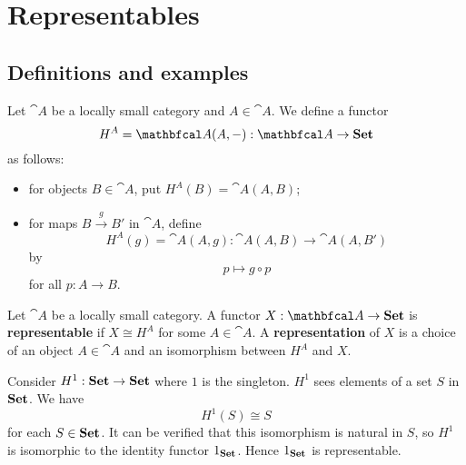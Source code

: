 \section{Representables}
\subsection{Definitions and examples}
\begin{definition}
    Let $\cat{A}$ be a locally small category and $A\in\cat{A}$. We define a functor
    \begin{equation*}
        H^A=\cat{A}(A,-): \cat{A}\to\bcat{Set}
    \end{equation*}
    as follows:
    \begin{itemize}
        \item for objects $B\in\cat{A}$, put $H^A(B)=\cat{A}(A,B)$;
        \item for maps $B\xrightarrow{g}B'$ in $\cat{A}$, define
            \begin{equation*}
                H^A(g)=\cat{A}(A,g): \cat{A}(A,B)\to\cat{A}(A,B')
            \end{equation*}
            by
            \begin{equation*}
                p\mapsto g\circ p
            \end{equation*}
            for all $p:A\to B$.
    \end{itemize}
\end{definition}

\begin{definition}
    Let $\cat{A}$ be a locally small category. A functor $X:\cat{A}\to\bcat{Set}$ is \textbf{representable} if $X\cong H^A$ for some $A\in\cat{A}$. A \textbf{representation} of $X$ is a choice of an object $A\in\cat{A}$ and an isomorphism between $H^A$ and $X$.
\end{definition}

\begin{example}
    Consider $H^1:\mathbf{Set}\to\mathbf{Set}$ where $1$ is the singleton. $H^1$ sees elements of a set $S$ in $\mathbf{Set}$. We have
    \begin{equation*}
        H^1(S)\cong S
    \end{equation*}
    for each $S\in\mathbf{Set}$. It can be verified that this isomorphism is natural in $S$, so $H^1$ is isomorphic to the identity functor $1_{\mathbf{Set}}$. Hence $1_{\mathbf{Set}}$ is representable.
\end{example}

